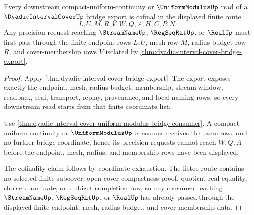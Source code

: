 \begin{theorem}
\label{thm:dyadic-interval-cover-bridge-export-cofinality}
Every downstream compact-uniform-continuity or $\UniformModulusUp$ read of a $\DyadicIntervalCoverUp$ bridge export is cofinal in the displayed finite route
$$
L,U,M,R,V,W,Q,A,H,C,P,N.
$$
Any precision request reaching $\StreamNameUp$, $\RegSeqRatUp$, or $\RealUp$ must first pass through the finite endpoint rows $L,U$, mesh row $M$, radius-budget row $R$, and cover-membership rows $V$ isolated by \autoref{thm:dyadic-interval-cover-bridge-export}.
\end{theorem}
\begin{proof}
Apply \autoref{thm:dyadic-interval-cover-bridge-export}. The export exposes exactly the endpoint, mesh, radius-budget, membership, stream-window, readback, seal, transport, replay, provenance, and local naming rows, so every downstream read starts from that finite coordinate list.

Use \autoref{thm:dyadic-interval-cover-uniform-modulus-bridge-consumer}. A compact-uniform-continuity or $\UniformModulusUp$ consumer receives the same rows and no further bridge coordinate, hence its precision requests cannot reach $W,Q,A$ before the endpoint, mesh, radius, and membership rows have been displayed.

The cofinality claim follows by coordinate exhaustion. The listed route contains no selected finite subcover, open-cover compactness proof, quotient real equality, choice coordinate, or ambient completion row, so any consumer reaching $\StreamNameUp$, $\RegSeqRatUp$, or $\RealUp$ has already passed through the displayed finite endpoint, mesh, radius-budget, and cover-membership data.
\end{proof}
